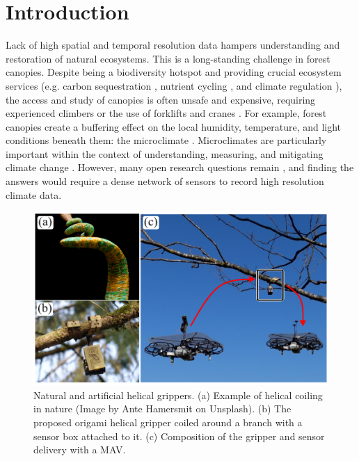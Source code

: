 \section{Introduction}

Lack of high spatial and temporal resolution data hampers understanding and restoration of natural ecosystems. This is a long-standing challenge in forest canopies. Despite being a biodiversity hotspot \cite{Nakamura2017, Ozanne2003d} and providing crucial ecosystem services (e.g. carbon sequestration \cite{Harris2012, Didham2004}, nutrient cycling \cite{CE2002}, and climate regulation \cite{Ellison2012}), the access and study of canopies is often unsafe and expensive, requiring experienced climbers or the use of forklifts and cranes \cite{Parker1992}. For example, forest canopies create a buffering effect on the local humidity, temperature, and light conditions beneath them: the microclimate \cite{Nakamura2017}. Microclimates are particularly important within the context of understanding, measuring, and mitigating climate change \cite{Frenne2021, Zellweger2020, VonArx2012}. However, many open research questions remain \cite{Jucker2020, Bachofen2020, Law2020}, and finding the answers would require a dense network of sensors to record high resolution climate data.
\begin{figure} [htbp]
    \centering
    \includegraphics{chapters/papers/OG/figs/fig_1_all-in-one/Figure_1.pdf}
    \caption{Natural and artificial helical grippers. (a) Example of helical coiling in nature (Image by Ante Hamersmit on Unsplash). (b) The proposed origami helical gripper coiled around a branch with a sensor box attached to it. (c) Composition of the gripper and sensor delivery with a MAV.}
    \label{fig:bio-inspiration}
\end{figure}


